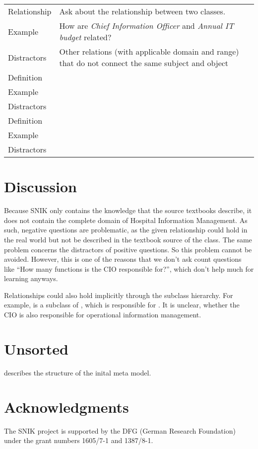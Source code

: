 \documentclass[sw]{iosart2x}
\renewcommand{\citet}{\cite}%
\begin{document}
\begin{table*}
\begin{tabulary}{\textwidth}{lL}
Relationship		&Ask about the relationship between two classes.\\
Example			&How are \emph{Chief Information Officer} and \emph{Annual IT budget} related?\\
Distractors		&Other relations (with applicable domain and range) that do not connect the same subject and object\\
\midrule
Definition		&\\
Example			&\\
Distractors		&\\
\midrule
Definition		&\\
Example			&\\
Distractors		&\\
\bottomrule
\end{tabulary}
\end{table*}

\section{Discussion}
Because SNIK only contains the knowledge that the source textbooks describe, it does not contain the complete domain of Hospital Information Management.
As such, negative questions are problematic, as the given relationship could hold in the real world but not be described in the textbook source of the class. 
The same problem concerns the distractors of positive questions.
So this problem cannot be avoided.
However, this is one of the reasons that we don't ask count questions like \enquote{How many functions is the CIO responsible for?}, which don't help much for learning anyways. %

Relationships could also hold implicitly through the subclass hierarchy.
For example,  is a subclass of , which is responsible for .
It is unclear, whether the CIO is also responsible for operational information management.

\section{Unsorted}
\citet{domaene} describes the structure of the inital meta model.

\section{Acknowledgments}
The SNIK project is supported by the DFG (German Research Foundation) under the grant numbers 1605/7-1 and 1387/8-1.


\end{document}
